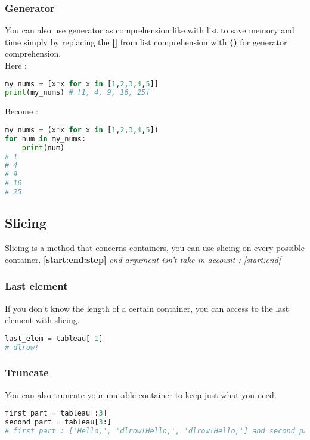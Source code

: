 \documentclass[a4paper, 12pt, titlepage]{scrartcl} %
\begin{document}
\subsubsection{Generator}
You can also use generator as comprehension like with list to save memory and time simply by replacing the \textbf{[]} from list comprehension with \textbf{()} for generator comprehension. \\
Here : 
\begin{lstlisting}[language=Python]
my_nums = [x*x for x in [1,2,3,4,5]]
print(my_nums) # [1, 4, 9, 16, 25]
\end{lstlisting} \vspace{5mm}

Become : 
\begin{lstlisting}[language=Python]
my_nums = (x*x for x in [1,2,3,4,5])
for num in my_nums:
    print(num)
# 1
# 4
# 9
# 16
# 25
\end{lstlisting} \vspace{5mm}

\subsection{Slicing}
Slicing is a method that concerns containers, you can use slicing on every possible container. \textbf{[start:end:step]} \textit{end argument isn't take in account : [start:end[}

\subsubsection{Last element} 
If you don't know the length of a certain container, you can access to the last element with slicing.
\begin{lstlisting}[language=Python]
last_elem = tableau[-1]
# dlrow!
\end{lstlisting} \vspace{5mm}

\subsubsection{Truncate} 
You can also truncate your mutable container to keep just what you need.
\begin{lstlisting}[language=Python]
first_part = tableau[:3]
second_part = tableau[3:]
# first_part : ['Hello,', 'dlrow!Hello,', 'dlrow!Hello,'] and second_part : ['dlrow!']
\end{lstlisting} \vspace{5mm}
\end{document}
